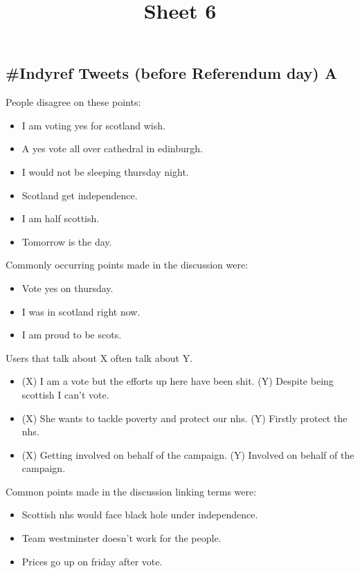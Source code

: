 \documentclass[tikz]{article}
\title{\textbf{Sheet 6}\vspace{-9ex}}
\date{}
\begin{document}
  \maketitle

  \begin{multicols}{2}
    \subsection*{\#Indyref Tweets (before Referendum day) A}
    People disagree on these points:
    \begin{itemize}[noitemsep,nolistsep,label={}]
		\item{I am voting yes for scotland wish.}
		\item{A yes vote all over cathedral in edinburgh.}
		\item{I would not be sleeping thursday night.}
		\item{Scotland get independence.}
		\item{I am half scottish.}
		\item{Tomorrow is the day.}
    \end{itemize}

    Commonly occurring points made in the discussion were:
    \begin{itemize}[noitemsep,nolistsep,label={}]
		\item{Vote yes on thursday.}
		\item{I was in scotland right now.}
		\item{I am proud to be scots.}
    \end{itemize}

    Users that talk about X often talk about Y.
    \begin{itemize}[noitemsep,nolistsep,label={}]
		\item{(X) I am a vote but the efforts up here have been shit. (Y) Despite being scottish I can't vote.}
		\item{(X) She wants to tackle poverty and protect our nhs. (Y) Firstly protect the nhs.}
		\item{(X) Getting involved on behalf of the campaign. (Y) Involved on behalf of the campaign.}
    \end{itemize}

    Common points made in the discussion linking terms were:
    \begin{itemize}[noitemsep,nolistsep,label={}]
		\item{Scottish nhs would face black hole under independence.}
		\item{Team westminster doesn't work for the people.}
		\item{Prices go up on friday after vote.}
    \end{itemize}


\end{multicols}
\end{document}
